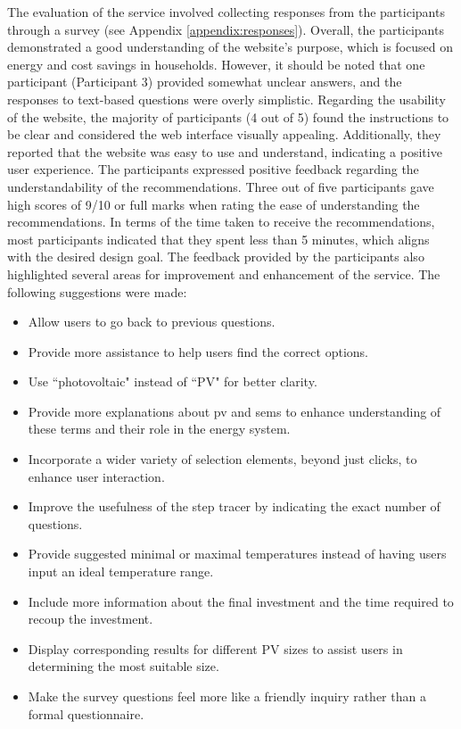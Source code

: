 The evaluation of the service involved collecting responses from the participants through a survey (see Appendix \ref{appendix:responses}). 
Overall, the participants demonstrated a good understanding of the website's purpose, which is focused on energy and cost savings in households. 
However, it should be noted that one participant (Participant 3) provided somewhat unclear answers, and the responses to text-based questions were overly simplistic.
Regarding the usability of the website, the majority of participants (4 out of 5) found the instructions to be clear and considered the web interface visually appealing. 
Additionally, they reported that the website was easy to use and understand, indicating a positive user experience.
The participants expressed positive feedback regarding the understandability of the recommendations. 
Three out of five participants gave high scores of 9/10 or full marks when rating the ease of understanding the recommendations. 
In terms of the time taken to receive the recommendations, most participants indicated that they spent less than 5 minutes, which aligns with the desired design goal.
The feedback provided by the participants also highlighted several areas for improvement and enhancement of the service. 
The following suggestions were made:

\begin{itemize}
  \item Allow users to go back to previous questions.
  \item Provide more assistance to help users find the correct options.
  \item Use ``photovoltaic" instead of ``PV" for better clarity.
  \item Provide more explanations about \gls{pv} and \gls{sems} to enhance understanding of these terms and their role in the energy system. 
  \item Incorporate a wider variety of selection elements, beyond just clicks, to enhance user interaction.
  \item Improve the usefulness of the step tracer by indicating the exact number of questions.
  \item Provide suggested minimal or maximal temperatures instead of having users input an ideal temperature range.
  \item Include more information about the final investment and the time required to recoup the investment.
  \item Display corresponding results for different PV sizes to assist users in determining the most suitable size.
  \item Make the survey questions feel more like a friendly inquiry rather than a formal questionnaire.
\end{itemize}


